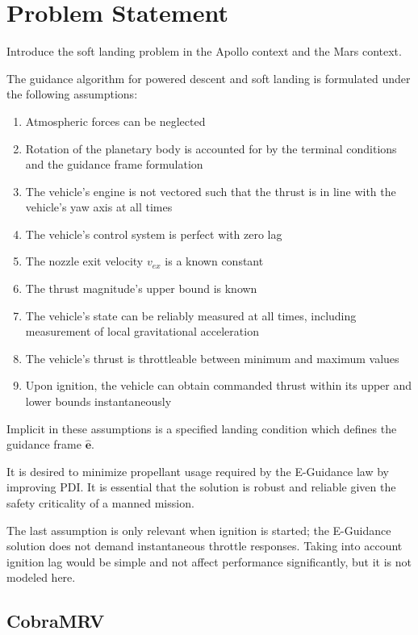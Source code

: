 \section{Problem Statement}

Introduce the soft landing problem in the Apollo context and the Mars context.

The guidance algorithm for powered descent and soft landing is formulated under the following assumptions:

\begin{enumerate}
	\item Atmospheric forces can be neglected
	\item Rotation of the planetary body is accounted for by the terminal conditions and the guidance frame formulation
	\item The vehicle's engine is not vectored such that the thrust is in line with the vehicle's yaw axis at all times
	\item The vehicle's control system is perfect with zero lag
	\item The nozzle exit velocity $v_{ex}$ is a known constant
	\item The thrust magnitude's upper bound is known
	\item The vehicle's state can be reliably measured at all times, including measurement of local gravitational acceleration
	\item The vehicle's thrust is throttleable between minimum and maximum values
	\item Upon ignition, the vehicle can obtain commanded thrust within its upper and lower bounds instantaneously
\end{enumerate}

Implicit in these assumptions is a specified landing condition which defines the guidance frame $\bm{\hat{e}}$. 

It is desired to minimize propellant usage required by the E-Guidance law by improving PDI. It is essential that the solution is robust and reliable given the safety criticality of a manned mission.

The last assumption is only relevant when ignition is started; the E-Guidance solution does not demand instantaneous throttle responses. Taking into account ignition lag would be simple and not affect performance significantly, but it is not modeled here.


\subsection{CobraMRV}


